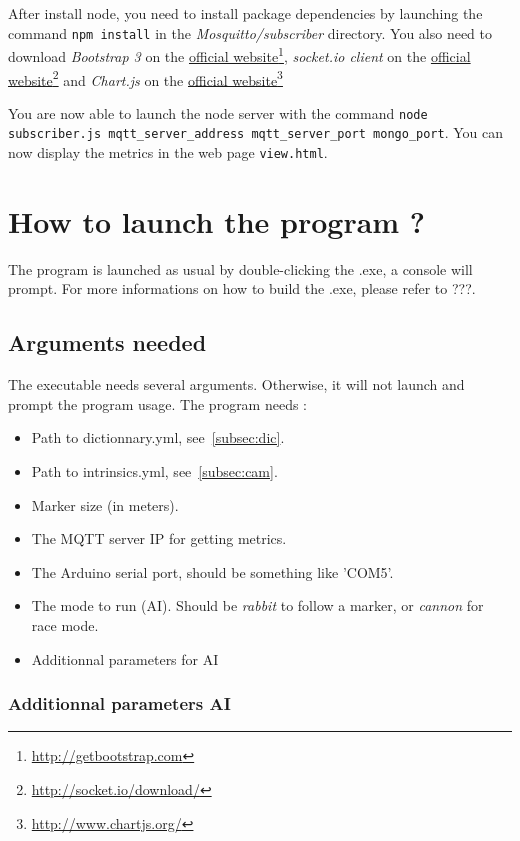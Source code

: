 \documentclass[a4paper,11pt]{report}
\begin{document}
After install node, you need to install package dependencies by launching the
command \texttt{npm install} in the \emph{Mosquitto/subscriber} directory. You
also need to download \emph{Bootstrap 3} on the
\href{http://getbootstrap.com/}{official
website}\footnote{\url{http://getbootstrap.com}}, \emph{socket.io client} on
the \href{http://socket.io/download/}{official
website}\footnote{\url{http://socket.io/download/}} and \emph{Chart.js} on the
\href{http://www.chartjs.org/}{official
website}\footnote{\url{http://www.chartjs.org/}}

You are now able to launch the node server with the command \texttt{node
subscriber.js mqtt\_server\_address mqtt\_server\_port mongo\_port}. You can
now display the metrics in the web page \texttt{view.html}.

\section{How to launch the program ?}

The program is launched as usual by double-clicking the .exe, a console will
prompt.
For more informations on how to build the .exe, please refer to ???.

\subsection{Arguments needed}

The executable needs several arguments. Otherwise, it will not launch and
prompt the program usage.
The program needs :

\begin{itemize}
    \item Path to dictionnary.yml, see~\ref{subsec:dic}.
    \item Path to intrinsics.yml, see~\ref{subsec:cam}.
    \item Marker size (in meters).
    \item The MQTT server IP for getting metrics.
    \item The Arduino serial port, should be something like 'COM5'.
    \item The mode to run (AI). Should be \emph{rabbit} to follow a marker, or
        \emph{cannon} for race mode.
    \item Additionnal parameters for AI
\end{itemize}

\subsubsection{Additionnal parameters AI}
\end{document}
